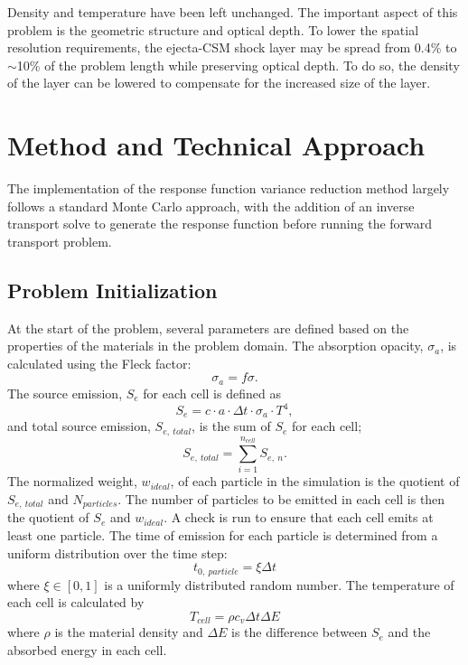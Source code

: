 \documentclass[]{article}
\begin{document}
		Density and temperature have been left unchanged. The important aspect of this problem is the geometric structure and optical depth. To lower the spatial resolution requirements, the ejecta-CSM shock layer may be spread from 0.4\% to $\sim$10\% of the problem length while preserving optical depth. To do so, the density of the layer can be lowered to compensate for the increased size of the layer.

\section{Method and Technical Approach}
	The implementation of the response function variance reduction method largely follows a standard Monte Carlo approach, with the addition of an inverse transport solve to generate the response function before running the forward transport problem. 

	\subsection{Problem Initialization}	
		At the start of the problem, several parameters are defined based on the properties of the materials in the problem domain. The absorption opacity, $\sigma_{a}$, is calculated using the Fleck factor:
		\begin{equation}
		\sigma_{a} = f \sigma.
		\end{equation}The source emission, $S_{e}$ for each cell is defined as
		\begin{equation}
			S_{e} = c \cdot a \cdot \Delta t \cdot \sigma_{a}  \cdot T^{4},
		\end{equation}
		and total source emission, $S_{e,~total}$, is the sum of $S_{e}$ for each cell;
		\begin{equation}
			S_{e,~total} = \sum_{i = 1}^{n_{cell}} S_{e,~n}.
		\end{equation}
		The normalized weight, $w_{ideal}$, of each particle in the simulation is the quotient of $S_{e,~total}$ and $N_{particles}$. The number of particles to be emitted in each cell is then the quotient of $S_{e}$ and $w_{ideal}$. A check is run to ensure that each cell emits at least one particle. The time of emission for each particle is determined from a uniform distribution over the time step:
		\begin{equation}
			t_{0,~particle} = \xi \Delta t
		\end{equation}
		where $\xi \in [0,1]$ is a uniformly distributed random number. The temperature of each cell is calculated by
		\begin{equation} \label{Eq: cell_T}
			T_{cell} = \rho c_{v} \Delta t \Delta E
		\end{equation}
		where $\rho$ is the material density and $\Delta E$ is the difference between $S_{e}$ and the absorbed energy in each cell.
\end{document}
